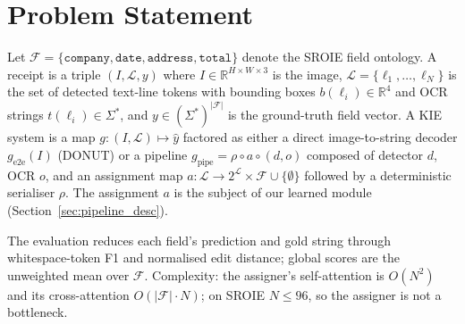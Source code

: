 \section{Problem Statement}
\label{sec:formal}

Let $\mathcal{F}=\{\texttt{company},\texttt{date},\texttt{address},
\texttt{total}\}$ denote the SROIE field ontology.  A receipt is a
triple $(I, \mathcal{L}, y)$ where $I \in \mathbb{R}^{H\times W\times 3}$
is the image, $\mathcal{L}=\{\ell_1,\ldots,\ell_N\}$ is the set of
detected text-line tokens with bounding boxes $b(\ell_i)\in\mathbb{R}^4$
and OCR strings $t(\ell_i)\in\Sigma^*$, and
$y\in(\Sigma^*)^{|\mathcal{F}|}$ is the ground-truth field vector.
A KIE system is a map $g:(I,\mathcal{L})\mapsto\hat{y}$ factored as
either a direct image-to-string decoder $g_{\text{e2e}}(I)$ (DONUT)
or a pipeline $g_{\text{pipe}}=\rho\circ a\circ(d,o)$ composed of
detector $d$, OCR $o$, and an assignment map
$a:\mathcal{L}\to2^{\mathcal{L}}\times\mathcal{F}\cup\{\emptyset\}$
followed by a deterministic serialiser $\rho$.  The assignment $a$ is
the subject of our learned module (Section~\ref{sec:pipeline_desc}).

The evaluation reduces each field's prediction and gold string
through whitespace-token F1 and normalised edit distance; global
scores are the unweighted mean over $\mathcal{F}$.  Complexity: the
assigner's self-attention is $O(N^2)$ and its cross-attention
$O(|\mathcal{F}|\cdot N)$; on SROIE $N\le 96$, so the assigner is
not a bottleneck.
